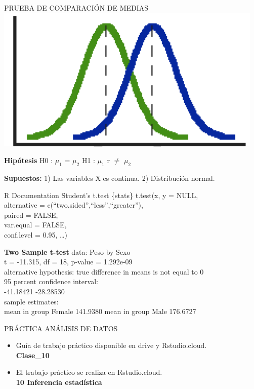 \documentclass[
  ignorenonframetext,
]{beamer}
\begin{document}
\begin{frame}{PRUEBA DE COMPARACIÓN DE MEDIAS}
\protect\hypertarget{prueba-de-comparaciuxf3n-de-medias}{}
\includegraphics[width=0.7\linewidth]{t-student}

\textbf{Hipótesis} H0 : \(\mu_1\) = \(\mu_2\) H1 : \(\mu_1\) r \(\neq\)
\(\mu_2\)

\textbf{Supuestos:} 1) Las variables X es continua. 2) Distribución
normal.
\end{frame}

\begin{frame}{R Documentation Student's t.test \{stats\}}
\protect\hypertarget{r-documentation-students-t.test-stats}{}
t.test(x, y = NULL,\\
alternative = c(``two.sided'',``less'',``greater''),\\
paired = FALSE,\\
var.equal = FALSE,\\
conf.level = 0.95, \ldots)

\textbf{Two Sample t-test} data: Peso by Sexo\\
t = -11.315, df = 18, p-value = 1.292e-09\\
alternative hypothesis: true difference in means is not equal to 0\\
95 percent confidence interval:\\
-41.18421 -28.28530\\
sample estimates:\\
mean in group Female 141.9380 mean in group Male 176.6727
\end{frame}

\begin{frame}{PRÁCTICA ANÁLISIS DE DATOS}
\protect\hypertarget{pruxe1ctica-anuxe1lisis-de-datos}{}
\begin{itemize}
\item
  Guía de trabajo práctico disponible en drive y Rstudio.cloud.\\
  \textbf{Clase\_10}
\item
  El trabajo práctico se realiza en Rstudio.cloud.\\
  \textbf{10 Inferencia estadística}
\end{itemize}
\end{frame}
\end{document}
